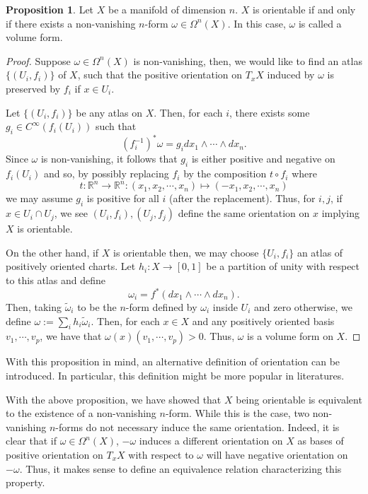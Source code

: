 \documentclass[]{article}
\theoremstyle{definition}
\theoremstyle{definition}
\newtheorem{proposition}{Proposition}[section]
\begin{document}
\begin{proposition}
  Let \(X\) be a manifold of dimension \(n\). \(X\) is orientable if and only if there 
  exists a non-vanishing \(n\)-form \(\omega \in \Omega^n(X)\). 
  In this case, \(\omega\) is called a volume form.
\end{proposition}
\begin{proof}
  Suppose \(\omega \in \Omega^n(X)\) is non-vanishing, then, we would like to find 
  an atlas \(\{(U_i, f_i)\}\) of \(X\), such that the positive orientation on 
  \(T_x X\) induced by \(\omega\) is preserved by \(f_i\) if \(x \in U_i\).
  
  Let \(\{(U_i, f_i)\}\) 
  be any atlas on \(X\). Then, for each \(i\), there exists some 
  \(g_i \in C^\infty(f_i(U_i))\) such that 
  \[(f_i^{-1})^* \omega = g_i dx_1 \wedge \cdots \wedge dx_n.\]
  Since \(\omega\) is non-vanishing, it follows that \(g_i\) is either positive 
  and negative on \(f_i(U_i)\) and so, by possibly replacing \(f_i\) by the 
  composition \(t \circ f_i\) where 
  \[t : \mathbb{R}^n \to \mathbb{R}^n : 
    (x_1, x_2, \cdots, x_n) \mapsto (-x_1, x_2, \cdots, x_n)\]
  we may assume \(g_i\) is positive for all \(i\) (after the replacement).
  Thus, for \(i, j\), if \(x \in U_i \cap U_j\), we see \((U_i, f_i), (U_j, f_j)\) 
  define the same orientation on \(x\) implying \(X\) is orientable.

  On the other hand, if \(X\) is orientable then, we may choose \(\{U_i, f_i\}\) 
  an atlas of positively oriented charts. Let \(h_i : X \to [0, 1]\) be a partition 
  of unity with respect to this atlas and define 
  \[\omega_i = f^*(dx_1 \wedge \cdots \wedge dx_n).\]
  Then, taking \(\tilde \omega_i\) to be the \(n\)-form defined by \(\omega_i\) 
  inside \(U_i\) and zero otherwise, we define \(\omega := \sum_i h_i \tilde \omega_i\).
  Then, for each \(x \in X\) and any positively oriented basis \(v_1, \cdots, v_p\), 
  we have that \(\omega(x)(v_1, \cdots, v_p) > 0\). Thus, \(\omega\) is a volume 
  form on \(X\). 
\end{proof}

With this proposition in mind, an alternative definition of orientation can be 
introduced. In particular, this definition might be more popular in literatures. 

With the above proposition, we have showed that \(X\) being orientable is 
equivalent to the existence of a non-vanishing \(n\)-form. While this is the 
case, two non-vanishing \(n\)-forms do not necessary induce the same orientation. 
Indeed, it is clear that if \(\omega \in \Omega^n(X)\), \(-\omega\) induces 
a different orientation on \(X\) as bases of positive orientation on \(T_x X\) 
with respect to \(\omega\) will have negative orientation on \(-\omega\). Thus,
it makes sense to define an equivalence relation characterizing this property.
\end{document}
